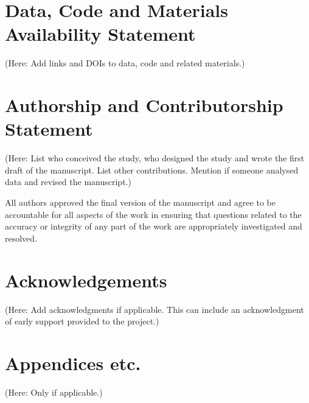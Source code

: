 \documentclass{ldr-article}
\begin{document}
\printbibliography


\section{Data, Code and Materials Availability Statement}

(Here: Add links and DOIs to data, code and related materials.)

\section{Authorship and Contributorship Statement}

(Here: List who conceived the study, who designed the study and wrote the first draft of the manuscript. List other contributions. Mention if someone analysed data and revised the manuscript.)

All authors approved the final version of the manuscript and agree to be accountable for all aspects of the work in ensuring that questions related to the accuracy or integrity of any part of the work are appropriately investigated and resolved.

\section{Acknowledgements}

(Here: Add acknowledgments if applicable. This can include an acknowledgment of early support provided to the project.)

\clearpage
\appendix

\section{Appendices etc.}

(Here: Only if applicable.)
\end{document}
